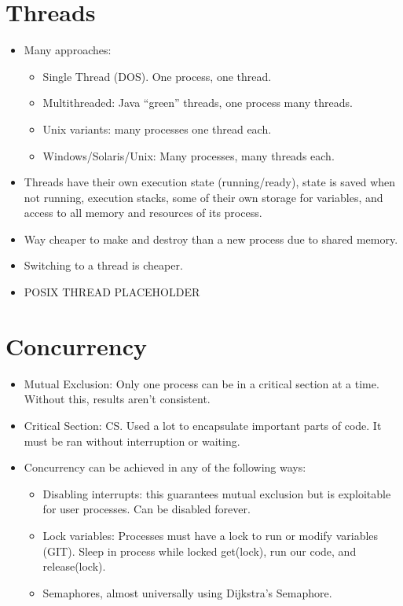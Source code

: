 \documentclass[fontsize=5pt]{scrartcl}
\begin{document}
\begin{multicols}{3}
     \section{Threads}
      \begin{itemize}
       \item Many approaches: 
       \begin{itemize}
        \item Single Thread (DOS). One process, one thread.
        \item Multithreaded: Java ``green'' threads, one process many threads.
        \item Unix variants: many processes one thread each.
        \item Windows/Solaris/Unix: Many processes, many threads each.
       \end{itemize}
       \item Threads have their own execution state (running/ready), state is saved when not running, execution stacks, 
             some of their own storage for variables, and access to all memory and resources of its process.
       \item Way cheaper to make and destroy than a new process due to shared memory.
       \item Switching to a thread is cheaper.
       \item {{POSIX THREAD PLACEHOLDER}}
      \end{itemize}
      
      \section{Concurrency}
        \begin{itemize}
          \item Mutual Exclusion: Only one process can be in a critical section at a time. Without this, results aren't consistent.
          \item Critical Section: CS. Used a lot to encapsulate important parts of code. It must be ran without interruption or waiting.
          \item Concurrency can be achieved in any of the following ways:
          \begin{itemize}
            \item Disabling interrupts: this guarantees mutual exclusion but is exploitable for user processes. Can be disabled forever.
            \item Lock variables: Processes must have a lock to run or modify variables (GIT). Sleep in process while locked
                  get(lock), run our code, and release(lock).
            \item Semaphores, almost universally using Dijkstra's Semaphore.
          \end{itemize}


\end{itemize}
\end{multicols}
\end{document}
